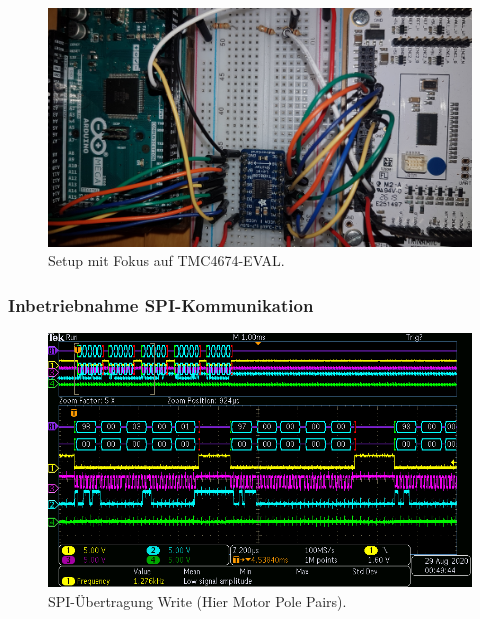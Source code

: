 \begin{figure}[H]
	\centering
	\includegraphics[angle = 180,width=\textwidth]{graphics/2_EVAL}
	\caption{Setup mit Fokus auf TMC4674-EVAL.}
	\label{fig:2_EVAL}
\end{figure}


\subsubsection{Inbetriebnahme SPI-Kommunikation}\label{Appendix:TMC4671_SPI}

\begin{figure}[H]
\center
\includegraphics[width = \textwidth]{graphics/TMC4671_Beschreiben_1}
\caption{SPI-Übertragung Write (Hier Motor Pole Pairs).}
\label{fig:TMC4671_Lesen_1}
\end{figure}

